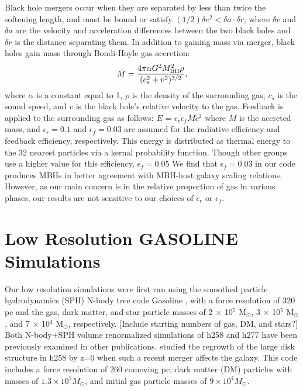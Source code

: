 \documentclass[12pt,headA,chapB]{fiskthesis}
\begin{document}
Black hole mergers occur when they are separated by less than twice the softening length, and must be bound or satisfy $(1/2) \delta v^2 < \delta a \cdot \delta r$,  where $\delta v$ and $\delta a$ are the velocity and acceleration differences between the two black holes and $\delta r$ is the distance separating them. In addition to gaining mass via merger, black holes gain mass through Bondi-Hoyle gas accretion:
\begin{equation}
\dot{M} = \frac{4 \pi \alpha G^2 M^{2}_{\rm BH} \rho}{(c^{2}_{s} + v^2)^{3/2}},
\end{equation}
where $\alpha$ is a constant equal to 1, $\rho$ is the density of the surrounding gas, $c_s$ is the sound speed, and $v$ is the black hole's relative velocity to the gas. Feedback is applied to the surrounding gas as follows: $\dot{E}$ = $\epsilon _{r}$$\epsilon_{f}$$\dot{M}$$c^2$ where $\dot{M}$ is the accreted mass, and $\epsilon _r = 0.1$ and $\epsilon _f = 0.03$ are assumed for the radiative efficiency and feedback efficiency, respectively. This energy is distributed as thermal energy to the 32 nearest particles via a kernal probability function. Though other groups use a higher value for this efficiency, $\epsilon _f = 0.05$ \citep{Sijacki2007,DiMatteo2008} We find that $\epsilon_f = 0.03$ in our code produces MBHs in better agreement with MBH-host galaxy scaling relations. However, as our main concern is in the relative proportion of gas in various phases, our results are not sensitive to our choices of $\epsilon _{r}$ or $\epsilon_{f}$.
 
\section{\normalsize Low Resolution GASOLINE Simulations}

Our low resolution simulations were first run using the smoothed particle hydrodynamics (SPH) N-body tree code Gasoline \citep[][Stadel 2001, how do I cite a thesis?]{Wadsley2004}, with a force resolution of 320 pc and the gas, dark matter, and star particle masses of 2 $\times$ 10$^5$ M$_{\odot}$, 3 $\times$ 10$^5$ M$_{\odot}$, and 7 $\times$ 10$^4$ M$_{\odot}$, respectively.  [Include starting numbers of gas, DM, and stars?] Both N-body+SPH volume renormalized simulations of h258 and h277 have been previously examined in other publications. \cite{Governato2009} studied the regrowth of the large disk structure in h258 by z=0 when such a recent merger affects the galaxy. This code includes a force resolution of 260 comoving pc, dark matter (DM) particles with masses of $1.3 \times 10^5 M_{\odot}$, and initial gas particle masses of $9 \times 10^4 M_{\odot}$.  
	
\end{document}
